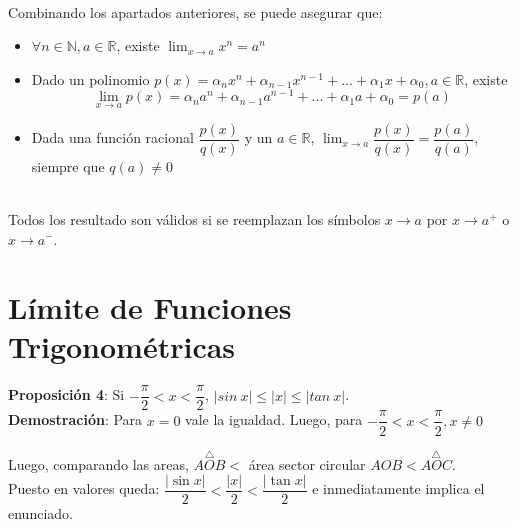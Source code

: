 \documentclass[11pt,a4paper]{article}
\newcommand\Base[1][0]{
\begin{scope}[xshift=#1]
\clip
  (-0.5,5.5) rectangle (5.5,-0.5);
  \draw[->]
  (-0.5,0) -- (5,0) node[right] {$u$};
\draw[->]
  (0,-0.5) -- (0,5) node[above] {$v$};
\coordinate (O) at (0,0) node[above left] {$O$};
\coordinate (aux1) at (40:4);
\coordinate (aux2) at (aux1|-0,0);
\coordinate (aux3) at (4,{4*tan(40)});
\node at (4.2, 0.2) {$A$};
\node at (3.1, 3) {$B$};
\node at (4.2, 3.7) {$C$};
\draw
  (O) -- (aux3) -- (aux3|-0,0)
  (aux1) -- (aux2);
\draw[thick,red!70!black] 
  (O) circle (4);
\pic[draw,"$x$",angle radius=30pt,angle eccentricity=1.2] {angle = aux2--O--aux1};   
\end{scope}  
}
\begin{document}
\noindent \dotfill\\
Combinando los apartados anteriores, se puede asegurar que:
\begin{itemize}
\item $\forall n \in \mathbb{N}, a \in \mathbb{R}$, existe $\displaystyle{\lim_{x\to a} x^n = a^n}$
\item Dado un polinomio $p(x)=\alpha_nx^n+\alpha_{n-1}x^{n-1}+...+\alpha_1x+\alpha_0, a \in \mathbb{R}$, existe $$\lim_{x\to a}p(x) = \alpha_na^n+\alpha_{n-1}a^{n-1}+...+\alpha_1a+\alpha_0 = p(a)$$
\item Dada una funci\'on racional $\dfrac{p(x)}{q(x)}$ y un $a \in \mathbb{R}$, $\displaystyle{\lim_{x\to a}\dfrac{p(x)}{q(x)} = \dfrac{p(a)}{q(a)}}$, siempre que $q(a)\not = 0$
\end{itemize}
\noindent \dotfill\\
Todos los resultado son v\'alidos si se reemplazan los s\'imbolos $x\rightarrow a$ por $x\rightarrow a^+$ o $x\rightarrow a^-$.

\newpage
\section{L\'imite de Funciones Trigonom\'etricas}
\noindent \textbf{Proposici\'on 4}: Si $-\dfrac{\pi}{2} < x < \dfrac{\pi}{2}$, $|sin\ x| \leq |x| \leq |tan\ x|$.\\
\noindent \textbf{Demostraci\'on}: Para $x=0$ vale la igualdad. Luego, para $-\dfrac{\pi}{2} < x < \dfrac{\pi}{2}, x \not = 0$

\hspace{-1.5cm}
\vspace{.1cm}
Luego, comparando las areas, $\overset{\triangle}{AOB} <$ \'area sector circular $AOB < \overset{\triangle}{AOC}$.\\
Puesto en valores queda: $\dfrac{|\sin x|}{2} < \dfrac{|x|}{2} < \dfrac{|\tan x|}{2}$ e inmediatamente implica el enunciado.\\
\end{document}
